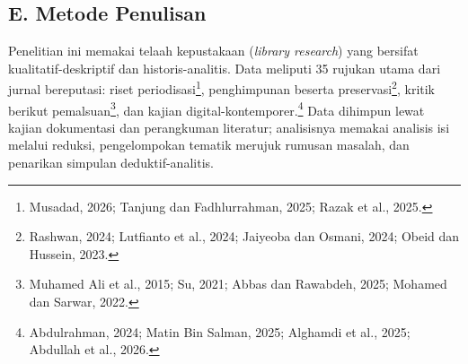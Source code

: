 \subsection*{E. Metode Penulisan}

Penelitian ini memakai telaah kepustakaan (\textit{library research}) yang bersifat kualitatif-deskriptif dan historis-analitis. Data meliputi 35 rujukan utama dari jurnal bereputasi: riset periodisasi\footnote{Musadad, 2026; Tanjung dan Fadhlurrahman, 2025; Razak et al., 2025.}, penghimpunan beserta preservasi\footnote{Rashwan, 2024; Lutfianto et al., 2024; Jaiyeoba dan Osmani, 2024; Obeid dan Hussein, 2023.}, kritik berikut pemalsuan\footnote{Muhamed Ali et al., 2015; Su, 2021; Abbas dan Rawabdeh, 2025; Mohamed dan Sarwar, 2022.}, dan kajian digital-kontemporer.\footnote{Abdulrahman, 2024; Matin Bin Salman, 2025; Alghamdi et al., 2025; Abdullah et al., 2026.} Data dihimpun lewat kajian dokumentasi dan perangkuman literatur; analisisnya memakai analisis isi melalui reduksi, pengelompokan tematik merujuk rumusan masalah, dan penarikan simpulan deduktif-analitis.

